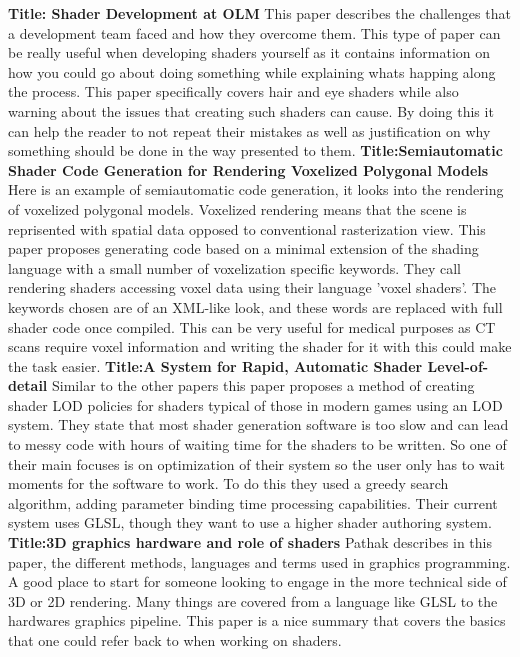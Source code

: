 \documentclass{scrartcl}
\begin{document}
	\textbf{Title: Shader Development at OLM}\cite{Ogak}
	\newline
This paper describes the challenges that a development team faced and how they overcome them. This type of paper can be really useful when developing shaders yourself as it contains information on how you could go about doing something while explaining whats happing along the process. This paper specifically covers hair and eye shaders while also warning about the issues that creating such shaders can cause. By doing this it can help the reader to not repeat their mistakes as well as justification on why something should be done in the way presented to them.
	\newline
	\newline
	\newline
	\textbf{Title:Semiautomatic Shader Code Generation for Rendering Voxelized Polygonal Models}\cite{Fische}
	\newline
Here is an example of semiautomatic code generation, it looks into the rendering of voxelized polygonal models. Voxelized rendering means that the scene is reprisented with spatial data opposed to conventional rasterization view. This paper proposes generating code based on a minimal extension of the shading language with a small number of voxelization specific keywords. They call rendering shaders accessing voxel data using their language 'voxel shaders'. The keywords chosen are of an XML-like look, and these words are replaced with full shader code once compiled. This can be very useful for medical purposes as CT scans require voxel information and writing the shader for it with this could make the task easier.
	\newline
	\newline
	\newline
	\textbf{Title:A System for Rapid, Automatic Shader Level-of-detail}\cite{He:2015}
	\newline
Similar to the other papers this paper proposes a method of creating shader LOD policies for shaders typical of those in modern games using an LOD system. They state that most shader generation software is too slow and can lead to messy code with hours of waiting time for the shaders to be written. So one of their main focuses is on optimization of their system so the user only has to wait moments for the software to work. To do this they used a greedy search algorithm, adding parameter binding time processing capabilities. Their current system uses GLSL, though they want to use a higher shader authoring system.
	\newline
	\newline
	\newline
	\textbf{Title:3D graphics hardware and role of shaders}\cite{Pathak}
	\newline
Pathak describes in this paper, the different methods, languages and terms used in graphics programming. A good place to start for someone looking to engage in the more technical side of 3D or 2D rendering. Many things are covered from a language like GLSL to the hardwares graphics pipeline. This paper is a nice summary that covers the basics that one could refer back to when working on shaders.
	
	
	
	
	
\end{document}
